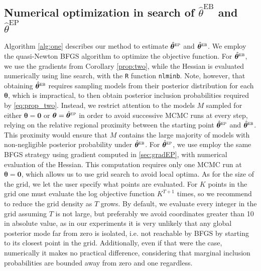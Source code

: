 \documentclass[12pt]{article}
\newcommand{\mb}[1]{\mathbf{#1}}
\newcommand{\btheta}{{\bm{\theta}}}
\newcommand{\hthetaeb}{\hat{\btheta}^{\textsc{eb}}}
\newcommand{\hthetaep}{\hat{\btheta}^{\textsc{ep}}}
\newcommand{\davidcom}[1]{{\color{red} [DR. #1]} }
\begin{document}
\subsection{Numerical optimization in search of $\hat{\theta}^{\text{EB}}$ and $\hat{\theta}^{\text{EP}}$} \label{sec:algorithm}

Algorithm \ref{alg:one} describes our method to estimate $\hthetaep$ and $\hthetaeb$. We employ the quasi-Newton BFGS algorithm to optimize the objective function. For $\hthetaeb$, we use the gradients from Corollary \ref{prop:two}, while the Hessian is evaluated numerically using line search, with the \texttt{R} function \texttt{nlminb}. Note, however, that obtaining $\hthetaeb$ requires sampling models from their posterior distribution for each $\btheta$, which is impractical, to then obtain posterior inclusion probabilities required by \eqref{eq:prop_two}. Instead, we restrict attention to the models $M$ sampled for either $\btheta = \mb{0}$ or $\btheta = \hthetaep$ in order to avoid successive MCMC runs at every step, relying on the relative regional proximity between the starting point $\hthetaep$ and $\hthetaeb$. This proximity would ensure that $M$ contains the large majority of models with non-negligible posterior probability under $\hthetaeb$. For $\hthetaep$, we use employ the same BFGS strategy using gradient computed in \ref{sec:gradEP}, with numerical evaluation of the Hessian. This computation requires only one MCMC run at $\btheta = \mb{0}$, which allows us to use grid search to avoid local optima. As for the size of the grid, we let the user specify what points are evaluated. For $K$ points in the grid one must evaluate the log objective function $K^{T+1}$ times, so we recommend to reduce the grid density as $T$ grows. By default, we evaluate every integer in the grid assuming $T$ is not large, but preferably we avoid coordinates greater than 10 in absolute value, as in our experiments it is very unlikely that any global posterior mode far from zero is isolated, i.e. not reachable by BFGS by starting to its closest point in the grid. Additionally, even if that were the case, numerically it makes no practical difference, considering that marginal inclusion probabilities are bounded away from zero and one regardless.
\end{document}
